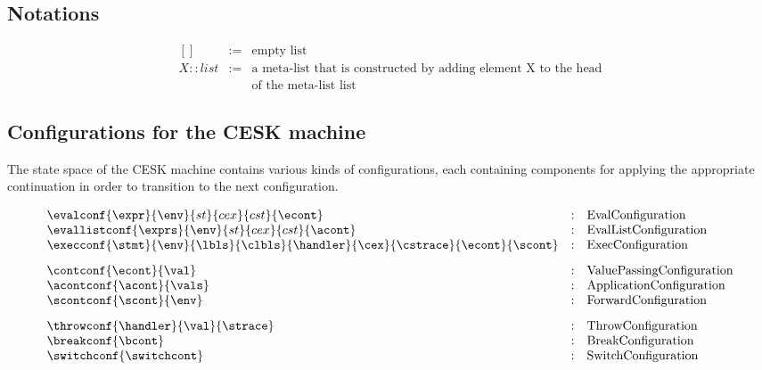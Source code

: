 \documentclass{article}
\begin{document}
\subsection{Notations}
\label{subsec:notations}

\[
  \begin{array}{lcl}
    [] &:=& \textrm{empty list}\\
    X :: list &:=& \textrm{a meta-list that is constructed by adding element X to the head}\\
    && \textrm{of the meta-list list}
  \end{array}
\]
\subsection{Configurations for the CESK machine}
\label{subsec:cesk-configs}
The state space of the CESK machine contains various kinds of configurations, each containing components for applying the appropriate continuation in order to transition to the next configuration. 

\[
  \begin{array}{lcl}
	\evalconf{\expr}{\env}{st}{cex}{cst}{\econt} & : &
	\textrm{EvalConfiguration}\\

	\evallistconf{\exprs}{\env}{st}{cex}{cst}{\acont} & : &
	\textrm{EvalListConfiguration}\\

	\execconf{\stmt}{\env}{\lbls}{\clbls}{\handler}{\cex}{\cstrace}{\econt}{\scont}  & : &
	\textrm{ExecConfiguration}\\[3mm]

	\contconf{\econt}{\val} & : &
	\textrm{ValuePassingConfiguration}\\

	\acontconf{\acont}{\vals} & : &
	\textrm{ApplicationConfiguration}\\

	\scontconf{\scont}{\env} & : &
	\textrm{ForwardConfiguration}\\[3mm]

	\throwconf{\handler}{\val}{\strace} & : &
	\textrm{ThrowConfiguration}\\

	\breakconf{\bcont} & : &
	\textrm{BreakConfiguration}\\

	\switchconf{\switchcont} & : &
	\textrm{SwitchConfiguration}\\

  \end{array}
\]
\end{document}
